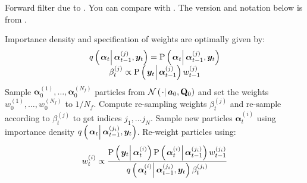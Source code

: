 \documentclass[9pt, notitlepage]{article}
\newcommand\StateX{\Statex\hspace{\algorithmicindent}}
\renewcommand{\vec}[1]{\bm{#1}}
\newcommand{\mat}[1]{\mathbf{#1}}
\newcommand{\Lparen}[1]{\left( #1\right)}
\newcommand{\Cond}[2]{\left. #1 \vphantom{#2} \right\vert  #2}
\newcommand{\Prob}{\text{P}}
\newcommand{\optor}[2]{#1\Lparen{#2}}
\newcommand{\optorC}[3]{\optor{#1}{\Cond{#2}{#3}}}
\newcommand{\propC}[2]{\optorC{\Prob}{#1}{#2}}
\newcommand{\normalC}[3]{\optorC{\mathcal{N}}{#1}{#2,#3}}
\newcommand{\IDC}[2]{\optorC{q}{#1}{#2}}
\newcommand{\partic}[3]{#1_{#2}^{\Lparen{#3}}}
\newcommand{\nPart}{N}
\newcommand{\nPeriods}{d}
\begin{document}
\begin{algorithm}[H]
\caption{Forward filter due to \cite{pitt99}. You can compare with \citet[page 20 and 25]{doucet09}. The version and notation below is from \citet[page 449]{fearnhead10}.}\label{alg:forward}
\begin{algorithmic}[1]\raggedright
\INPUT
\Statex Importance density and specification of weights are optimally given by:
\Statex \begin{equation}\begin{matrix}
	\IDC{\vec{\alpha}_t}{\partic{\vec{\alpha}}{t-1}{j}, \vec{y}_t} = \propC{\vec{\alpha}_t}{\partic{\vec{\alpha}}{t-1}{j}, \vec{y}_t} \\
	\partic{\beta}{t}{j} \propto \propC{\vec{y}_t}{\partic{\vec{\alpha}}{t-1}{j}}\partic{w}{t-1}{j}
\end{matrix}\end{equation}
%
\State Sample $\partic{\vec{\alpha}}{0}{1},\dots,\partic{\vec{\alpha}}{0}{\nPart_f}$ particles from $\normalC{\cdot}{\vec{a}_0}{\mat{Q}_0}$ and set the weights $\partic{w}{0}{1},\dots,\partic{w}{0}{\nPart_f}$ to $1 / \nPart_f$.
%
\For{$t=1,\dots, \nPeriods$}
\State Compute re-sampling weights $\partic{\beta}{t}{j}$ and re-sample according to $\partic{\beta}{t}{j}$ to get indices $j_1,\dots j_\nPart$.
\EndProcedure
%
\State Sample new particles $\partic{\vec{\alpha}}{t}{i}$ using importance density $\IDC{\vec{\alpha}_t}{\partic{\vec{\alpha}}{t-1}{j_i}, \vec{y}_t}$.
\EndProcedure
%
\State Re-weight particles using:
\StateX \begin{equation}\label{eqn:forwardWeight}
	\partic{w}{t}{i} \propto \frac{
		\propC{\vec{y}_t}{\partic{\vec{\alpha}}{t}{i}}
		\propC{\partic{\vec{\alpha}}{t}{i}}{\partic{\vec{\alpha}}{t-1}{j_i}}
		\partic{w}{t-1}{j_i}
	}{ %
		\IDC{\partic{\vec{\alpha}}{t}{i}}{\partic{\vec{\alpha}}{t-1}{j_i}, \vec{y}_t}
		\partic{\beta}{t}{j_i}
	}
\end{equation}
\EndProcedure
\EndFor
\end{algorithmic}
\end{algorithm}
\end{document}
